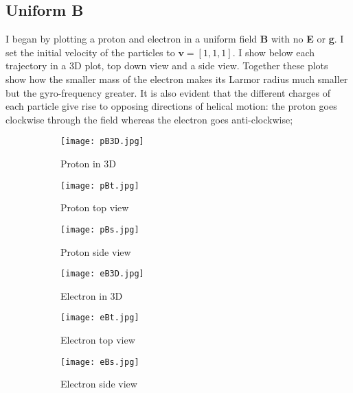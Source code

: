 \documentclass[14paper,11pt,hidelinks]{article}
\begin{document}
\subsection{Uniform B}
I began by plotting a proton and electron in a uniform field \textbf{B} with no \textbf{E} or \textbf{g}. I set the initial velocity of the particles to \begin{math} \mathbf{v}=[1,1,1] \end{math}. I show below each trajectory in a 3D plot, top down view and a side view. Together these plots show how the smaller mass of the electron makes its Larmor radius much smaller but the gyro-frequency greater. It is also evident that the different charges of each particle give rise to opposing directions of helical motion: the proton goes clockwise through the field whereas the electron goes anti-clockwise;
\newline
\begin{figure}[h!]
\centering
\begin{subfigure}[b]{0.3\linewidth}
\texttt{[image: pB3D.jpg]} 
\caption*{Proton in 3D}
\end{subfigure}
\begin{subfigure}[b]{0.3\linewidth}
\texttt{[image: pBt.jpg]}
\caption*{Proton top view}
\end{subfigure}
\begin{subfigure}[b]{0.3\linewidth}
\texttt{[image: pBs.jpg]}
\caption*{Proton side view}
\end{subfigure}
\caption{}
\end{figure}
\begin{figure}[h!]
\centering
\begin{subfigure}[b]{0.3\linewidth}
\texttt{[image: eB3D.jpg]} 
\caption*{Electron in 3D}
\end{subfigure}
\begin{subfigure}[b]{0.3\linewidth}
\texttt{[image: eBt.jpg]}
\caption*{Electron top view}
\end{subfigure}
\begin{subfigure}[b]{0.3\linewidth}
\texttt{[image: eBs.jpg]}
\caption*{Electron side view}
\end{subfigure}
\caption{}
\end{figure}
\newline
\FloatBarrier


\end{document}

